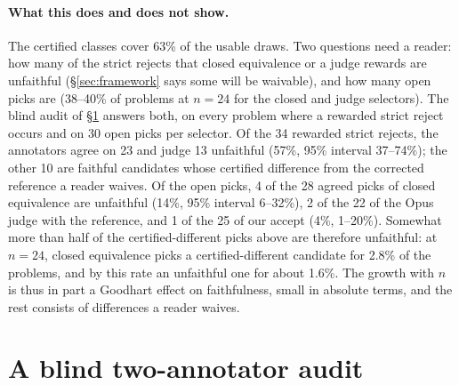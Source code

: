 \documentclass[10pt]{article}
\theoremstyle{definition}
\begin{document}
\paragraph{What this does and does not show.} The certified classes cover 63\% of the usable
draws. Two questions need a reader: how many of the strict rejects that closed equivalence or a
judge rewards are unfaithful (\S\ref{sec:framework} says some will be waivable), and how
many open picks are (38--40\% of problems at $n=24$ for the closed and judge selectors). The
blind audit of \S\ref{sec:blind} answers both, on every problem where a rewarded strict reject
occurs and on 30 open picks per selector. Of the 34 rewarded strict rejects, the annotators agree
on 23 and judge 13 unfaithful (57\%, 95\% interval 37--74\%); the other 10 are faithful candidates
whose certified difference from the corrected reference a reader waives. Of the open picks, 4 of
the 28 agreed picks of closed equivalence are unfaithful (14\%, 95\% interval 6--32\%), 2 of the
22 of the Opus judge with the reference, and 1 of the 25 of our accept (4\%, 1--20\%). Somewhat
more than half of the certified-different picks above are therefore unfaithful: at $n=24$, closed
equivalence picks a certified-different candidate for 2.8\% of the problems, and by this rate an
unfaithful one for about 1.6\%. The growth with $n$ is thus in part a Goodhart effect on
faithfulness, small in absolute terms, and the rest consists of differences a reader waives.

\section{A blind two-annotator audit}\label{sec:blind}

\end{document}
